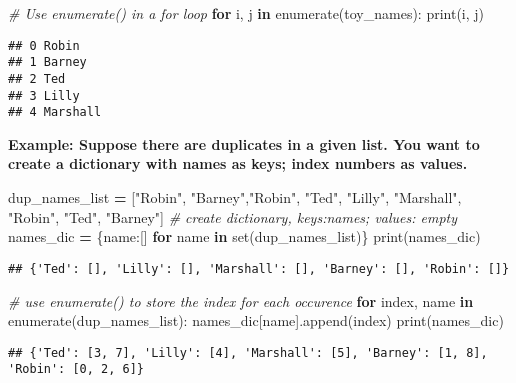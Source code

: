 \documentclass[
]{book}
\newenvironment{Shaded}{\begin{snugshade}}{\end{snugshade}}
\newcommand{\BuiltInTok}[1]{#1}
\newcommand{\CommentTok}[1]{\textcolor[rgb]{0.56,0.35,0.01}{\textit{#1}}}
\newcommand{\ControlFlowTok}[1]{\textcolor[rgb]{0.13,0.29,0.53}{\textbf{#1}}}
\newcommand{\KeywordTok}[1]{\textcolor[rgb]{0.13,0.29,0.53}{\textbf{#1}}}
\newcommand{\NormalTok}[1]{#1}
\newcommand{\OperatorTok}[1]{\textcolor[rgb]{0.81,0.36,0.00}{\textbf{#1}}}
\newcommand{\StringTok}[1]{\textcolor[rgb]{0.31,0.60,0.02}{#1}}
\begin{document}
\begin{Shaded}
\begin{Highlighting}[]
\CommentTok{\# Use enumerate() in a for loop}
\ControlFlowTok{for}\NormalTok{ i, j }\KeywordTok{in} \BuiltInTok{enumerate}\NormalTok{(toy\_names):}
  \BuiltInTok{print}\NormalTok{(i, j)}
\end{Highlighting}
\end{Shaded}

\begin{verbatim}
## 0 Robin
## 1 Barney
## 2 Ted
## 3 Lilly
## 4 Marshall
\end{verbatim}

\textbf{Example: Suppose there are duplicates in a given list. You want to create a dictionary with names as keys; index numbers as values.}

\begin{Shaded}
\begin{Highlighting}[]
\NormalTok{dup\_names\_list }\OperatorTok{=}\NormalTok{ [}\StringTok{"Robin"}\NormalTok{, }\StringTok{"Barney"}\NormalTok{,}\StringTok{"Robin"}\NormalTok{, }\StringTok{"Ted"}\NormalTok{, }\StringTok{"Lilly"}\NormalTok{, }\StringTok{"Marshall"}\NormalTok{, }\StringTok{"Robin"}\NormalTok{, }\StringTok{"Ted"}\NormalTok{, }\StringTok{"Barney"}\NormalTok{]}
\CommentTok{\# create dictionary, keys:names; values: empty}
\NormalTok{names\_dic }\OperatorTok{=}\NormalTok{ \{name:[] }\ControlFlowTok{for}\NormalTok{ name }\KeywordTok{in} \BuiltInTok{set}\NormalTok{(dup\_names\_list)\}}
\BuiltInTok{print}\NormalTok{(names\_dic)}
\end{Highlighting}
\end{Shaded}

\begin{verbatim}
## {'Ted': [], 'Lilly': [], 'Marshall': [], 'Barney': [], 'Robin': []}
\end{verbatim}

\begin{Shaded}
\begin{Highlighting}[]
\CommentTok{\# use enumerate() to store the index for each occurence}
\ControlFlowTok{for}\NormalTok{ index, name }\KeywordTok{in} \BuiltInTok{enumerate}\NormalTok{(dup\_names\_list):}
\NormalTok{  names\_dic[name].append(index)}
\BuiltInTok{print}\NormalTok{(names\_dic)}
\end{Highlighting}
\end{Shaded}

\begin{verbatim}
## {'Ted': [3, 7], 'Lilly': [4], 'Marshall': [5], 'Barney': [1, 8], 'Robin': [0, 2, 6]}
\end{verbatim}
\end{document}
